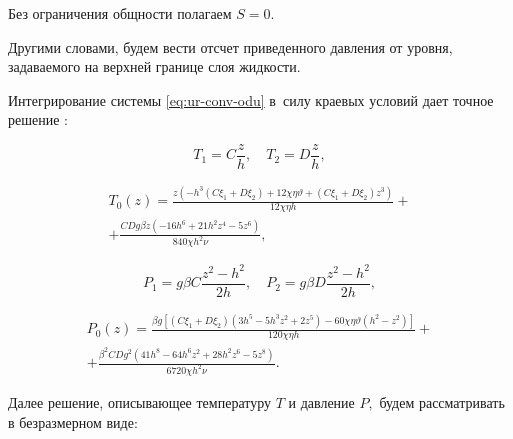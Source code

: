 Без ограничения общности полагаем $S=0$. 

Другими словами, будем вести отсчет приведенного давления от уровня, задаваемого на верхней границе слоя жидкости.




\smallskip



\label{sec:solution}

Интегрирование системы \eqref{eq:ur-conv-odu} в~силу краевых условий дает точное решение \cite{Burm_Pros_Samara}:


$$T_1=C\frac{z}{h}, \quad T_2=D\frac{z}{h},$$

\begin{multline}

T_0(z)=\displaystyle \frac{z \left(-h^3 (C \xi_1 + D \xi_2) +

    12 \chi \eta \vartheta + (C \xi_1 + D\xi_2) z^3 \right)}{12 \chi \eta h} +

\\

+\displaystyle \frac{C D g\beta z \left(-16 h^6 + 21 h^2 z^4 -

    5 z^6 \right)}{840 \chi h^2 \nu},

\end{multline}

$$P_1=\displaystyle g\beta C\frac{z^2-h^2}{2h}, \quad P_2=\displaystyle g\beta D\frac{z^2-h^2}{2h},$$

\begin{multline}

P_0(z)=\displaystyle \frac{\beta g \left[ \left(C \xi_1 + D\xi_2\right)\left(3 h^5-5 h^3z^2+2 z^5\right) - 60 \chi \eta \vartheta\left(h^2 - z^2\right)\right]}{120 \chi \eta h} +

\\

+\displaystyle \frac{ \beta^2 C D g^2 \left(41 h^8 - 64 h^6 z^2 + 28 h^2 z^6 - 5 z^8 \right)}{6720 \chi h^2 \nu}.

\end{multline}



Далее решение, описывающее температуру $T$ и давление $P,$ будем рассматривать в безразмерном виде:

